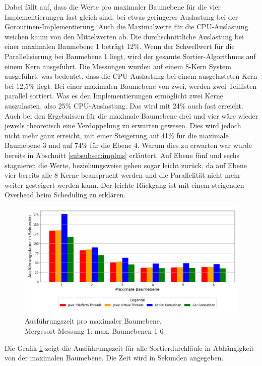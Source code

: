 \documentclass[fontsize=12pt,paper=a4,twoside=semi,parskip=half-,headsepline,headinclude]{scrreprt}
\begin{document}
Dabei fällt auf, dass die Werte pro maximaler Baumebene für die vier Implementierungen fast gleich sind, bei etwas geringerer Auslastung bei der Goroutinen-Implementierung. Auch die Maximalwerte für die CPU-Auslastung weichen kaum von den Mittelwerten ab. Die durchschnittliche Auslastung bei einer maximalen Baumebene 1 beträgt 12\%. Wenn der Schwellwert für die Parallelisierung bei Baumebene 1 liegt, wird der gesamte Sortier-Algorithmus auf einem Kern ausgeführt. Die Messungen wurden auf einem 8-Kern System ausgeführt, was bedeutet, dass die CPU-Auslastung bei einem ausgelasteten Kern bei 12,5\% liegt. Bei einer maximalen 
Baumebene von zwei, werden zwei Teillisten parallel sortiert. Was es den Implementierungen ermöglicht zwei Kerne auszulasten, also 25\% CPU-Auslastung. Das wird mit 24\% auch fast erreicht. Auch bei den Ergebnissen für die maximale Baumebene drei und vier wäre wieder jeweils theoretisch eine Verdoppelung zu erwarten gewesen. Dies wird jedoch nicht mehr ganz erreicht, mit einer Steigerung auf 41\% für die maximale Baumebene 3 und auf 74\% für die Ebene 4. Warum dies zu erwarten war wurde bereits in Abschnitt \ref{subsubsec:implms} erläutert. Auf Ebene fünf und sechs stagnieren die Werte, beziehungsweise gehen sogar leicht zurück, da auf Ebene vier bereits alle 8 Kerne beansprucht werden und die Parallelität nicht mehr weiter gesteigert werden kann. Der leichte Rückgang ist mit einem steigenden Overhead beim Scheduling zu erklären.

\begin{figure}[H]
	\centering
	\includegraphics[scale=0.5]{figures/mergesort/Maximalebauebenen1-6/execution_time_plot.png}
	\caption{Ausführungszeit pro maximaler Baumebene,\\ Mergesort Messung 1: max. Baumebenen 1-6}
	\label{fig:ms1-6Zeit}
\end{figure}

Die Grafik \ref{fig:ms1-6Zeit} zeigt die Ausführungszeit für alle Sortierdurchläufe in Abhängigkeit von der maximalen Baumebene. Die Zeit wird in Sekunden angegeben.
\end{document}
